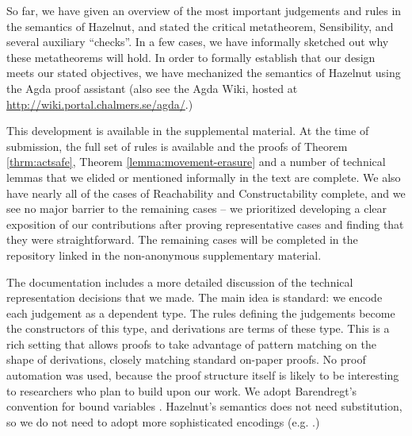 So far, we have given an overview of the most important judgements and rules in
the semantics of Hazelnut, and stated the critical metatheorem, Sensibility, and several auxiliary ``checks''. In a few
cases, we have informally sketched out why these metatheorems will hold. In order to formally establish that our design meets our stated objectives, we
have mechanized the semantics of Hazelnut using the Agda proof assistant \cite{norell:thesis} (also see the Agda Wiki, hosted
at \url{http://wiki.portal.chalmers.se/agda/}.)

This development is available in the supplemental material. At the time of submission, the full set of rules is available and the proofs of Theorem \ref{thrm:actsafe}, Theorem \ref{lemma:movement-erasure} and a number of technical lemmas that we elided or mentioned informally in the text are complete. We also have nearly all of the cases of Reachability and Constructability complete, and we see no major barrier to the remaining cases -- we prioritized developing a clear exposition of our contributions after proving representative cases and finding that they were straightforward. The remaining cases will be completed in the repository linked in the non-anonymous supplementary material.

The documentation 
includes a more detailed discussion of the technical representation
decisions that we made. The main idea is standard: we encode each judgement as a
dependent type. The rules defining the judgements become the constructors of this
type, and derivations are terms of these type. This is a rich
setting that allows proofs to take advantage of pattern matching on the
shape of derivations, closely matching standard on-paper proofs. No proof automation was used, because the proof structure itself is likely to be interesting to researchers who plan to build upon our work. 
We adopt Barendregt's convention for
bound variables \cite{urban}. Hazelnut's semantics does not need substitution, so we do not need to adopt more sophisticated encodings (e.g. \cite{lh09unibind,Pouillard11}.)


